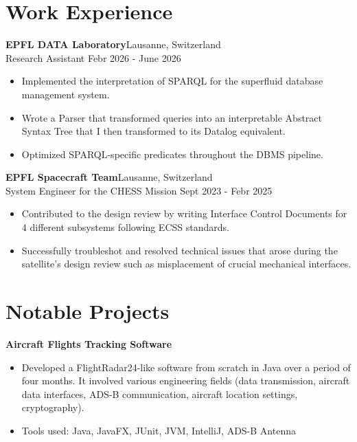 \documentclass[a4paper, 10pt]{article}
\newenvironment{highlights}{
    \begin{itemize}[
        topsep=0.10 cm,
        parsep=0.10 cm,
        partopsep=0pt,
        itemsep=0pt,
        leftmargin=0.4 cm + 10pt
    ]
}{
    \end{itemize}
} %
\let\hrefWithoutArrow\href
\renewcommand{\href}[2]{\hrefWithoutArrow{#1}{\ifthenelse{\equal{#2}{}}{ }{#2 }\raisebox{.15ex}{\footnotesize \faExternalLink*}}}
\begin{document}
    \section{Work Experience}
	\textbf{EPFL DATA Laboratory}\href{https://www.epfl.ch/labs/data/research/}{}\hfill Lausanne, Switzerland\\
	{Research Assistant} \hfill Febr 2026 - June 2026
	\begin{highlights}
		\item Implemented the interpretation of SPARQL for the superfluid database management system.
        \item Wrote a Parser that transformed queries into an interpretable Abstract Syntax Tree that I then transformed to its Datalog equivalent.
        \item Optimized SPARQL-specific predicates throughout the DBMS pipeline.
	\end{highlights}
        \textbf{EPFL Spacecraft Team}\href{https://www.epflspacecraftteam.ch/}{}\hfill Lausanne, Switzerland\\
        {System Engineer for the CHESS Mission} \hfill Sept 2023 - Febr 2025
        \begin{highlights}
            \item Contributed to the design review by writing Interface Control Documents for 4 different subsystems following ECSS standards.%
            \item Successfully troubleshot and resolved technical issues that arose during the satellite's design review such as misplacement of crucial mechanical interfaces.
        \end{highlights}

    \section{Notable Projects}
        \textbf{Aircraft Flights Tracking Software}\href{https://github.com/maignal/Javions}{}
        \begin{highlights}
            \item Developed a FlightRadar24-like software from scratch in Java over a period of four months. It involved various
            engineering fields (data transmission, aircraft data interfaces, ADS-B communication, aircraft location settings, cryptography).
            \item Tools used: Java, JavaFX, JUnit, JVM, IntelliJ, ADS-B Antenna
        \end{highlights}
\end{document}
